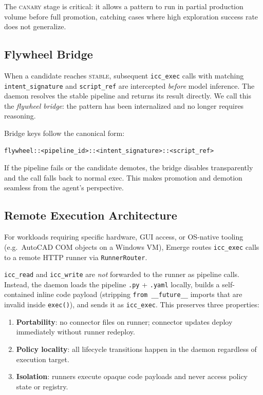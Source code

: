\documentclass[11pt,a4paper]{article}
\begin{document}
The \textsc{canary} stage is critical: it allows a pattern to run in partial production volume before full
promotion, catching cases where high exploration success rate does not generalize.

\subsection{Flywheel Bridge}

When a candidate reaches \textsc{stable}, subsequent \texttt{icc\_exec} calls with matching
\texttt{intent\_signature} and \texttt{script\_ref} are intercepted \emph{before} model inference.
The daemon resolves the stable pipeline and returns its result directly.
We call this the \emph{flywheel bridge}: the pattern has been internalized and no longer requires reasoning.

Bridge keys follow the canonical form:
\begin{lstlisting}
flywheel::<pipeline_id>::<intent_signature>::<script_ref>
\end{lstlisting}

If the pipeline fails or the candidate demotes, the bridge disables transparently and the call falls back to
normal exec. This makes promotion and demotion seamless from the agent's perspective.

\subsection{Remote Execution Architecture}
\label{sec:remote}

For workloads requiring specific hardware, GUI access, or OS-native tooling (e.g.\ AutoCAD COM objects on a
Windows VM), Emerge routes \texttt{icc\_exec} calls to a remote HTTP runner via \texttt{RunnerRouter}.

\texttt{icc\_read} and \texttt{icc\_write} are \emph{not} forwarded to the runner as pipeline calls.
Instead, the daemon loads the pipeline \texttt{.py} + \texttt{.yaml} locally, builds a self-contained inline
code payload (stripping \texttt{from \_\_future\_\_} imports that are invalid inside \texttt{exec()}),
and sends it as \texttt{icc\_exec}.
This preserves three properties:

\begin{enumerate}
  \item \textbf{Portability}: no connector files on runner; connector updates deploy immediately without runner redeploy.
  \item \textbf{Policy locality}: all lifecycle transitions happen in the daemon regardless of execution target.
  \item \textbf{Isolation}: runners execute opaque code payloads and never access policy state or registry.
\end{enumerate}
\end{document}
